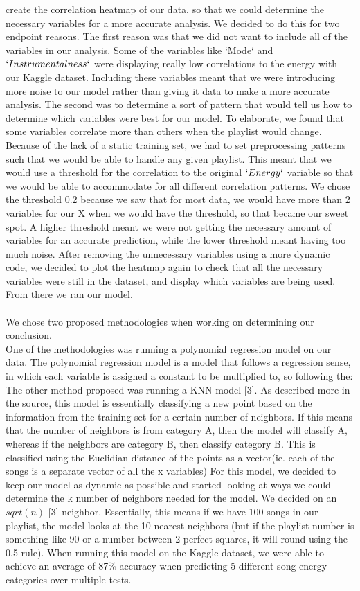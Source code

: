 \documentclass[titlepage]{article}
\begin{document}
create the correlation heatmap of our data, so that we could determine the necessary variables for a more accurate analysis. We decided to do this for two endpoint reasons. The first reason was that we did not want to include all of the variables in our analysis. Some of the variables like `Mode` and $`Instrumentalness`$ were displaying really low correlations to the energy with our Kaggle dataset. Including these variables meant that we were introducing more noise to our model rather than giving it data to make a more accurate analysis. The second was to determine a sort of pattern that would tell us how to determine which variables were best for our model. To elaborate, we found that some variables correlate more than others when the playlist would change. Because of the lack of a static training set, we had to set preprocessing patterns such that we would be able to handle any given playlist. This meant that we would use a threshold for the correlation to the original $`Energy`$ variable so that we would be able to accommodate for all different correlation patterns. We chose the threshold 0.2 because we saw that for most data, we would have more than 2 variables for our X when we would have the threshold, so that became our sweet spot. A higher threshold meant we were not getting the necessary amount of variables for an accurate prediction, while the lower threshold meant having too much noise. After removing the unnecessary variables using a more dynamic code, we decided to plot the heatmap again to check that all the necessary variables were still in the dataset, and display which variables are being used. From there we ran our model.
\\\\
We chose two proposed methodologies when working on determining our conclusion. 
\\
One of the methodologies was running a polynomial regression model on our data.
The polynomial regression model is a model that follows a regression sense, in which each variable is assigned a constant to be multiplied to, so following the:
\\
The other method proposed was running a KNN model [3]. As described more in the source, this model is essentially classifying a new point based on the information from the training set for a certain number of neighbors. If this means that the number of neighbors is from category A, then the model will classify A, whereas if the neighbors are category B, then classify category B. This is classified using the Euclidian distance of the points as a vector(ie. each of the songs is a separate vector of all the x variables) For this model, we decided to keep our model as dynamic as possible and started looking at ways we could determine the k number of neighbors needed for the model. We decided on an $sqrt(n)$ [3] neighbor. Essentially, this means if we have 100 songs in our playlist, the model looks at the 10 nearest neighbors (but if the playlist number is something like 90 or a number between 2 perfect squares, it will round using the 0.5 rule). When running this model on the Kaggle dataset, we were able to achieve an average of 87\% accuracy when predicting 5 different song energy categories over multiple tests. 
\end{document}
